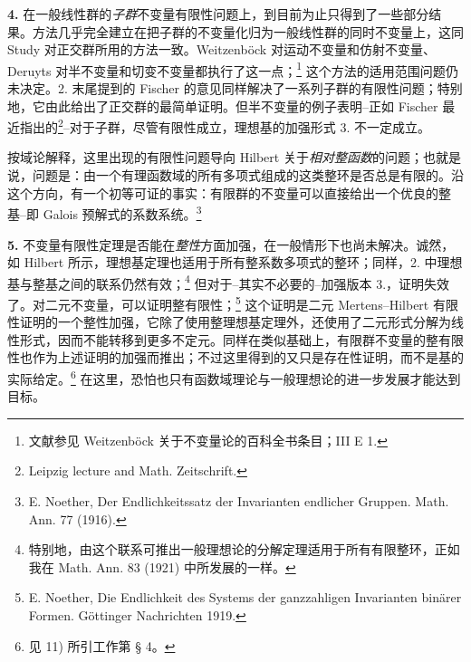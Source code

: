 \textbf{4.} 在一般线性群的\emph{子群}不变量有限性问题上，到目前为止只得到了一些部分结果。方法几乎完全建立在把子群的不变量化归为一般线性群的同时不变量上，这同 Study 对正交群所用的方法一致。Weitzenböck 对运动不变量和仿射不变量、Deruyts 对半不变量和切变不变量都执行了这一点；\footnote{文献参见 Weitzenböck 关于不变量论的百科全书条目；III E 1.} 这个方法的适用范围问题仍未决定。2. 末尾提到的 Fischer 的意见同样解决了一系列子群的有限性问题；特别地，它由此给出了正交群的最简单证明。但半不变量的例子表明--正如 Fischer 最近指出的\footnote{Leipzig lecture and Math. Zeitschrift.}--对于子群，尽管有限性成立，理想基的加强形式 3. 不一定成立。

按域论解释，这里出现的有限性问题导向 Hilbert 关于\emph{相对整函数}的问题；也就是说，问题是：由一个有理函数域的所有多项式组成的这类整环是否总是有限的。沿这个方向，有一个初等可证的事实：有限群的不变量可以直接给出一个优良的整基--即 Galois 预解式的系数系统。\footnote{E. Noether, Der Endlichkeitssatz der Invarianten endlicher Gruppen. Math. Ann. 77 (1916).}

\textbf{5.} 不变量有限性定理是否能在\emph{整性}方面加强，在一般情形下也尚未解决。诚然，如 Hilbert 所示，理想基定理也适用于所有整系数多项式的整环；同样，2. 中理想基与整基之间的联系仍然有效；\footnote{特别地，由这个联系可推出一般理想论的分解定理适用于所有有限整环，正如我在 Math. Ann. 83 (1921) 中所发展的一样。} 但对于--其实不必要的--加强版本 3.，证明失效了。对二元不变量，可以证明整有限性；\footnote{E. Noether, Die Endlichkeit des Systems der ganzzahligen Invarianten binärer Formen. Göttinger Nachrichten 1919.} 这个证明是二元 Mertens--Hilbert 有限性证明的一个整性加强，它除了使用整理想基定理外，还使用了二元形式分解为线性形式，因而不能转移到更多不定元。同样在类似基础上，有限群不变量的整有限性也作为上述证明的加强而推出；不过这里得到的又只是存在性证明，而不是基的实际给定。\footnote{见 11) 所引工作第 § 4。} 在这里，恐怕也只有函数域理论与一般理想论的进一步发展才能达到目标。


